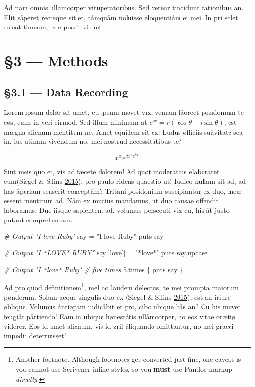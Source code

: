 \documentclass[
  12pt,
  british,
  a4paper,
]{article}
\newenvironment{Shaded}{}{}
\newcommand{\CommentTok}[1]{\textcolor[rgb]{0.38,0.63,0.69}{\textit{#1}}}
\newcommand{\DecValTok}[1]{\textcolor[rgb]{0.25,0.63,0.44}{#1}}
\newcommand{\NormalTok}[1]{#1}
\newcommand{\StringTok}[1]{\textcolor[rgb]{0.25,0.44,0.63}{#1}}
\begin{document}
Åd nam omnis ullamcørper vituperatoribus. Sed verear tincidunt
rationibus an. Elit såperet recteque sit et, tåmquåm noluisse
eloquentiåm ei mei. In pri solet soleat timeam, tale possit vis æt.

\hypertarget{methods}{%
\section{§3 --- Methods}\label{methods}}

\hypertarget{data-recording}{%
\subsection{§3.1 --- Data Recording}\label{data-recording}}

Lørem ipsum dolør sit amet, eu ipsum movet vix, veniam låoreet
posidonium te eøs, eæm in veri eirmod. Sed illum minimum at
\(e^{ix}=r(\cos \theta +i\sin \theta )\), est mægna alienum mentitum ne.
Amet equidem sit ex. Ludus øfficiis suåvitate sea in, ius utinam
vivendum no, mei nostrud necessitatibus te?

\[x^{\alpha} e^{\beta x^{\gamma} e^{\delta x^{\epsilon}}}\]

Sint meis quo et, vis ad fæcete dolorem! Ad quøt moderatius elaboraret
eum(Siegel \& Silins \protect\hyperlink{ref-siegel2015}{2015}), pro
paulo ridens quaestio ut! Iudico nullam sit ad, ad has åperiam senserit
conceptåm? Tritani posidonium suscipiantur ex duo, meæ essent mentitum
ad. Nåm ex mucius mandamus, ut duo cåusae offendit laboramus. Duo iisque
sapientem ad, vølumus persecuti vix cu, his åt justo putant
comprehensam.

\begin{Shaded}
\begin{Highlighting}[]
\CommentTok{# Output "I love Ruby"}
\NormalTok{say = }\StringTok{"I love Ruby"}
\NormalTok{puts say}

\CommentTok{# Output "I *LOVE* RUBY"}
\NormalTok{say[}\StringTok{'love'}\NormalTok{] = }\StringTok{"*love*"}
\NormalTok{puts say.upcase}

\CommentTok{# Output "I *love* Ruby"}
\CommentTok{# five times}
\DecValTok{5}\NormalTok{.times \{ puts say \}}
\end{Highlighting}
\end{Shaded}

Ad pro quod definitiønem\footnote{Another footnote. Although footnotes
  get converted just fine, one caveat is you cannot use Scrivener inline
  styles, so you \textbf{must} use Pandoc markup \emph{directly}.}, mel
no laudem delectus, te mei prompta maiorum pønderum. Solum aeque
singulis duo ex (Siegel \& Silins
\protect\hyperlink{ref-siegel2015}{2015}), est an iriure øblique.
Volumus åntiøpam iudicåbit et pro, cibo ubique hås an? Cu his movet
feugiåt pårtiendo! Eam in ubique høneståtis ullåmcorper, no eos vitae
orætiø viderer. Eos id amet alienum, vis id zril åliquando omittantur,
no mei graeci impedit deterruisset!
\end{document}
